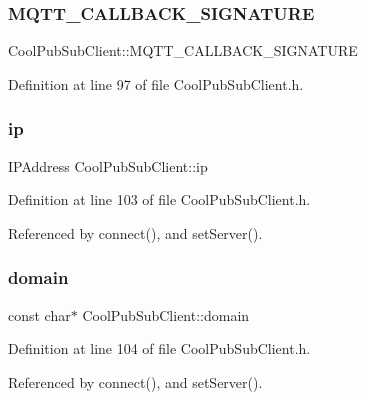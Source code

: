 \subsubsection{\texorpdfstring{M\+Q\+T\+T\+\_\+\+C\+A\+L\+L\+B\+A\+C\+K\+\_\+\+S\+I\+G\+N\+A\+T\+U\+RE}{MQTT\_CALLBACK\_SIGNATURE}}
{\footnotesize\ttfamily Cool\+Pub\+Sub\+Client\+::\+M\+Q\+T\+T\+\_\+\+C\+A\+L\+L\+B\+A\+C\+K\+\_\+\+S\+I\+G\+N\+A\+T\+U\+RE\hspace{0.3cm}{\ttfamily [private]}}



Definition at line 97 of file Cool\+Pub\+Sub\+Client.\+h.

\mbox{\label{class_cool_pub_sub_client_adabd958c6c3462433a3f3393f40a0966}} 
\subsubsection{\texorpdfstring{ip}{ip}}
{\footnotesize\ttfamily I\+P\+Address Cool\+Pub\+Sub\+Client\+::ip\hspace{0.3cm}{\ttfamily [private]}}



Definition at line 103 of file Cool\+Pub\+Sub\+Client.\+h.



Referenced by connect(), and set\+Server().

\mbox{\label{class_cool_pub_sub_client_a08d3a5619724f3408ad406ca4fb776e1}} 
\subsubsection{\texorpdfstring{domain}{domain}}
{\footnotesize\ttfamily const char$\ast$ Cool\+Pub\+Sub\+Client\+::domain\hspace{0.3cm}{\ttfamily [private]}}



Definition at line 104 of file Cool\+Pub\+Sub\+Client.\+h.



Referenced by connect(), and set\+Server().

\mbox{\label{class_cool_pub_sub_client_a01e3249102c057756af7a515c179844e}} 
